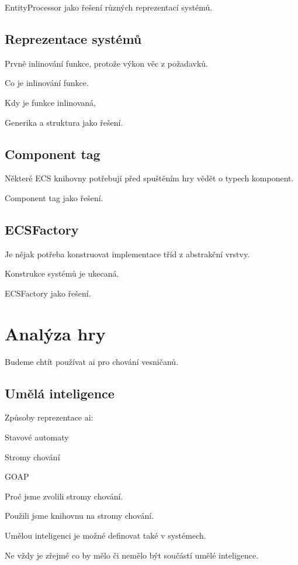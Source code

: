 EntityProcessor jako řešení různých reprezentací systémů.

\subsection{Reprezentace systémů}
Prvně inlinování funkce, protože výkon věc z požadavků.

Co je inlinování funkce.

Kdy je funkce inlinovaná,

Generika a struktura jako řešení.

\subsection{Component tag}
Některé ECS knihovny potřebují před spuštěním hry vědět o typech komponent.

Component tag jako řešení.

\subsection{ECSFactory}
Je nějak potřeba konstruovat implementace tříd z abstrakční vrstvy.

Konstrukce systémů je ukecaná.

ECSFactory jako řešení.

\section{Analýza hry}
Budeme chtít používat ai pro chování vesničanů.

\subsection{Umělá inteligence}
Způsoby reprezentace ai:

\begin{ordering}
    \item Stavové automaty
    \item Stromy chování
    \item GOAP
\end{ordering}

Proč jsme zvolili stromy chování.

Použili jsme knihovnu na stromy chování.

Umělou inteligenci je možné definovat také v systémech.

Ne vždy je zřejmé co by mělo či nemělo být součástí umělé inteligence.

